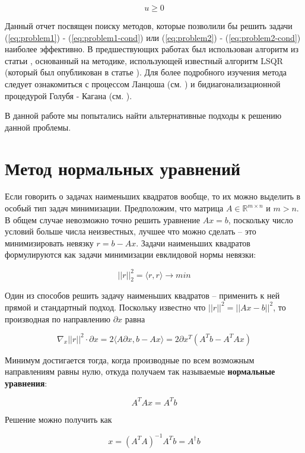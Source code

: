 \documentclass[a4paper, 12pt, titlepage]{article}
\theoremstyle{definition}
\theoremstyle{plain}
\theoremstyle{plain}
\begin{document}
\begin{equation}
 u \geq 0
\end{equation}

Данный отчет посвящен поиску методов, которые позволили бы решить задачи
(\ref{eq:problem1}) - (\ref{eq:problem1-cond}) или (\ref{eq:problem2}) -
(\ref{eq:problem2-cond}) наиболее эффективно. В предшествующих работах был
использован алгоритм из статьи \cite{BierlaireTointTuyttens1991}, основанный
на методике, использующей известный алгоритм LSQR (который был опубликован в 
статье \cite{PaigeSaunders1982}). Для более подробного изучения метода
следует ознакомиться с процессом Ланцоша (см. \cite{Lanczos1950}) и
бидиагонализационной процедурой Голубя - Кагана (см. \cite{Golub1965}).

В данной работе мы попытались найти альтернативные подходы к решению данной 
проблемы.

\section{Метод нормальных уравнений}

Если говорить о задачах наименьших квадратов вообще, то их можно выделить в
особый тип задач минимизации. Предположим, что матрица $A \in \mathbb{R}^{m
\times n}$ и $m > n$. В общем случае невозможно точно решить уравнение
$A x = b$, поскольку число условий больше числа неизвестных, лучшее что можно
сделать -- это минимизировать невязку $r = b - A x$. Задачи наименьших
квадратов формулируются как задачи минимизации евклидовой нормы невязки:

$$
||r||^{2}_{2} = \langle r, r \rangle \to min
$$

Один из способов решить задачу наименьших квадратов -- применить к ней прямой
и стандартный подход. Поскольку известно что $||r||^{2} = ||A x - b||^{2}$, то
производная по направлению $\partial x$ равна

$$
\nabla_{x} ||r||^{2} \cdot \partial x = 2 \langle A \partial x, b - A x\rangle =
2 \partial x^{T} (A^{T} b - A^{T} A x)
$$

Минимум достигается тогда, когда производные по всем возможным направлениям 
равны нулю, откуда получаем так называемые \textbf{нормальные уравнения}:

\begin{equation}
 A^{T} A x = A^{T} b
\end{equation}

Решение можно получить как

\begin{equation}
 x = (A^{T} A)^{-1} A^{T} b = A^{\dag} b
\end{equation}
\end{document}
